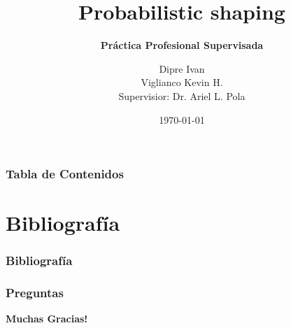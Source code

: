 \documentclass[xcolor=table,ps]{beamer}
\title[Probabilistic shaping] %
      {\textbf{Probabilistic shaping}}
\subtitle{\textbf{Práctica Profesional Supervisada}}
\author[] {\small Dipre Ivan\\ \small Viglianco Kevin H.\\ \vspace{0.2cm} \small Supervisior: Dr. Ariel L. Pola}
\date{\today} %
\begin{document}
\begin{frame}
  \titlepage
\end{frame}



\begin{frame} 
  \frametitle{\textbf{Tabla de Contenidos}}
  \tableofcontents
\end{frame}







\section{Bibliografía}
\begin{frame}%
  \frametitle{Bibliografía}
  \tiny
  
  
\end{frame}


\begin{frame}
  \frametitle{\textbf{Preguntas}}
   \begin{center}
     {\Huge \textbf{Muchas Gracias!}\\}
    \end{center}
\end{frame}
\end{document}
